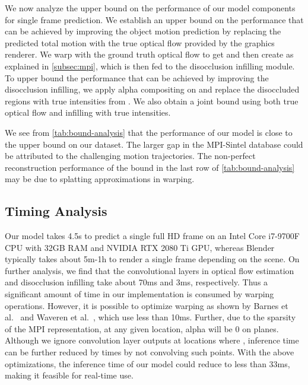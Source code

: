 \documentclass[preprint]{vgtc}
\def\etal{et al.}
\begin{document}
We now analyze the upper bound on the performance of our model components for single frame prediction.
    We establish an upper bound on the performance that can be achieved by improving the object motion prediction by replacing the predicted total motion with the true optical flow provided by the graphics renderer.
    We warp  with the ground truth optical flow to get  and then create  as explained in \autoref{subsec:mpi}, which is then fed to the disocclusion infilling module.
    To upper bound the performance that can be achieved by improving the disocclusion infilling, we apply alpha compositing on  and replace the disoccluded regions with true intensities from .
    We also obtain a joint bound using both true optical flow and infilling with true intensities.


    We see from \autoref{tab:bound-analysis} that the performance of our model is close to the upper bound on our dataset.
    The larger gap in the MPI-Sintel database could be attributed to the challenging motion trajectories.
    The non-perfect reconstruction performance of the bound in the last row of \autoref{tab:bound-analysis} may be due to splatting approximations in warping.

    \subsection{Timing Analysis}\label{subsec:inference-time}
    Our model takes 4.5s to predict a single full HD frame on an Intel Core i7-9700F CPU with 32GB RAM and NVIDIA RTX 2080 Ti GPU, whereas Blender typically takes about 5m-1h to render a single frame depending on the scene.
    On further analysis, we find that the convolutional layers in optical flow estimation and disocclusion infilling take about 70ms and 3ms, respectively.
    Thus a significant amount of time in our implementation is consumed by warping operations.
    However, it is possible to optimize warping as shown by Barnes \etal~\cite{barnes2017positional} and Waveren \etal~\cite{van2016asynchronous}, which use less than 10ms.
    Further, due to the sparsity of the MPI representation, at any given location, alpha will be 0 on  planes.
    Although we ignore convolution layer outputs at locations where , inference time can be further reduced by  times by not convolving such points.
    With the above optimizations, the inference time of our model could reduce to less than 33ms, making it feasible for real-time use.
\end{document}
